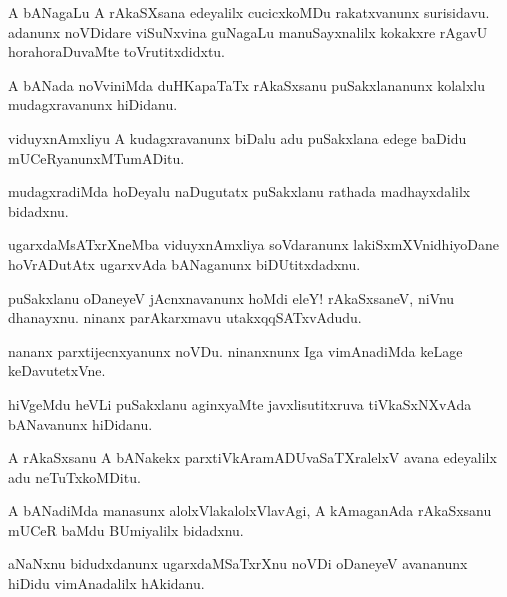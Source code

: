 \documentclass{article}
\begin{document}
\begin{mn}%
A bANagaLu A rAkaSXsana edeyalilx cucicxkoMDu rakatxvanunx surisidavu. adanunx noVDidare 
viSuNxvina guNagaLu manuSayxnalilx kokakxre rAgavU horahoraDuvaMte toVrutitxdidxtu.
\end{mn}

\begin{mn}%
A bANada noVviniMda duHKapaTaTx rAkaSxsanu puSakxlananunx kolalxlu mudagxravanunx hiDidanu.
\end{mn}

\begin{mn}%
viduyxnAmxliyu A kudagxravanunx biDalu adu puSakxlana edege baDidu mUCeRyanunxMTumADitu.
\end{mn}

\begin{mn}%
mudagxradiMda hoDeyalu naDugutatx puSakxlanu rathada madhayxdalilx bidadxnu.
\end{mn}

\begin{mn}%
ugarxdaMsATxrXneMba viduyxnAmxliya soVdaranunx lakiSxmXVnidhiyoDane hoVrADutAtx ugarxvAda 
bANaganunx biDUtitxdadxnu.
\end{mn}

\begin{mn}%
puSakxlanu oDaneyeV jAcnxnavanunx hoMdi eleY! rAkaSxsaneV, niVnu dhanayxnu. ninanx 
parAkarxmavu utakxqqSATxvAdudu.
\end{mn}

\begin{mn}%
nananx parxtijecnxyanunx noVDu. ninanxnunx Iga vimAnadiMda keLage keDavutetxVne.
\end{mn}

\begin{mn}%
hiVgeMdu heVLi puSakxlanu aginxyaMte javxlisutitxruva tiVkaSxNXvAda bANavanunx hiDidanu.
\end{mn}

\begin{mn}%
A rAkaSxsanu A bANakekx parxtiVkAramADUvaSaTXralelxV avana edeyalilx adu neTuTxkoMDitu.
\end{mn}

\begin{mn}%
A bANadiMda manasunx alolxVlakalolxVlavAgi, A kAmaganAda rAkaSxsanu mUCeR baMdu BUmiyalilx 
bidadxnu.
\end{mn}

\begin{mn}%
aNaNxnu bidudxdanunx ugarxdaMSaTxrXnu noVDi oDaneyeV avananunx hiDidu vimAnadalilx hAkidanu.
\end{mn}
\end{document}

